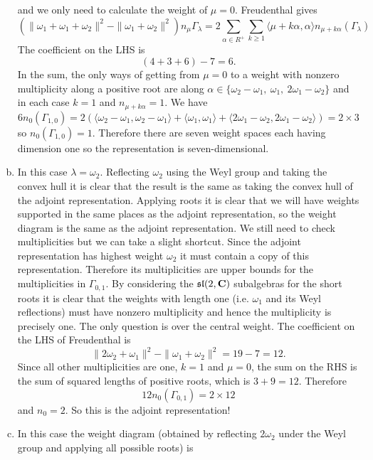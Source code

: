 \documentclass[12pt]{article}
\begin{document}
\begin{answer}
\begin{enumerate}[(a)]
and we only need to calculate the weight of $\mu=0$. Freudenthal gives
\[\left(\|\omega_1+\omega_1+\omega_2\|^2-\|\omega_1+\omega_2\|^2\right)n_{\mu}\Gamma_{\lambda}=2\sum_{\alpha\in R^+}\sum_{k\geq 1}\langle\mu+k\alpha,\alpha\rangle n_{\mu+k\alpha}(\Gamma_{\lambda})\]
The coefficient on the LHS is
\[(4+3+6)-7=6.\]
In the sum, the only ways of getting from $\mu=0$ to a weight with nonzero multiplicity along a positive root are along $\alpha\in\{\omega_2-\omega_1,\ \omega_1,\ 2\omega_1-\omega_2\}$ and in each case $k=1$ and $n_{\mu+k\alpha}=1$. We have
\[6n_0(\Gamma_{1,0})=2\left(\langle\omega_2-\omega_1,\omega_2-\omega_1\rangle+\langle\omega_1,\omega_1\rangle+\langle2\omega_1-\omega_2,2\omega_1-\omega_2\rangle\right)=2\times 3\]
so $n_0(\Gamma_{1,0})=1$. Therefore there are seven weight spaces each having dimension one so the representation is seven-dimensional.
\item In this case $\lambda=\omega_2$. Reflecting $\omega_2$ using the Weyl group and taking the convex hull it is clear that the result is the same as taking the convex hull of the adjoint representation. Applying roots it is clear that we will have weights supported in the same places as the adjoint representation, so the weight diagram is the same as the adjoint representation. We still need to check multiplicities but we can take a slight shortcut. Since the adjoint representation has highest weight $\omega_2$ it must contain a copy of this representation. Therefore its multiplicities are upper bounds for the multiplicities in $\Gamma_{0,1}$. By considering the $\mathfrak{sl}(2,\mathbf{C})$ subalgebras for the short roots it is clear that the weights with length one (i.e. $\omega_1$ and its Weyl reflections) must have nonzero multiplicity and hence the multiplicity is precisely one. The only question is over the central weight. The coefficient on the LHS of Freudenthal is
\[\|2\omega_2+\omega_1\|^2-\|\omega_1+\omega_2\|^2=19-7=12.\]
Since all other multiplicities are one, $k=1$ and $\mu=0$, the sum on the RHS is the sum of squared lengths of positive roots, which is $3+9=12$. Therefore
\[12n_0(\Gamma_{0,1})=2\times 12\]
and $n_0=2$. So this is the adjoint representation!
\item In this case the weight diagram (obtained by reflecting $2\omega_2$ under the Weyl group and applying all possible roots) is

\gtwolambdatwozero


\end{enumerate}
\end{answer}
\end{document}
